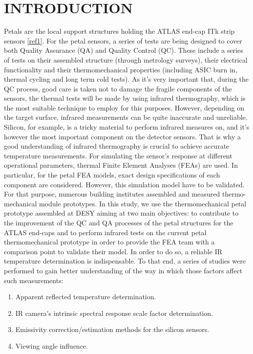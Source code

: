 \pagestyle{introduction}

\section*{\uppercase{Introduction}}\label{intro}
	\bigskip
	\bigskip
	Petals are the local support structures holding the ATLAS end-cap ITk strip sensors \ref{ref1}. For the petal sensors, a series of tests are being designed to cover both Quality Assurance (QA) and Quality Control (QC). These include a series of tests on their assembled structure (through metrology surveys), their electrical functionality and their thermomechanical properties (including ASIC burn in, thermal cycling and long term cold tests). 
	As it’s very important that, during the QC process, good care is taken not to damage the fragile components of the sensors, the thermal tests will be made by using infrared thermography, which is the most suitable technique to employ for this purposes. However, depending on the target surface, infrared measurements can be quite inaccurate and unreliable. Silicon, for example, is a tricky material to perform infrared measures on, and it’s however the most important component on the detector sensors. That is why a good understanding of infrared thermography is crucial to achieve accurate temperature measurements.
	For simulating the sensor's response at different operational parameters, thermal Finite Element Analyses (FEAs) are used. In particular, for the petal FEA models, exact design specifications of each component are considered. However, this simulation model have to be validated. For that purpose, numerous building institutes assembled and measured thermo-mechanical module prototypes. 
	In this study, we use the thermomechanical petal prototype assembled at DESY aiming at two main objectives: to contribute to the improvement of the QC and QA processes of the petal structures for the ATLAS end-caps and to perform infrared tests on the current petal thermomechanical prototype in order to provide the FEA team with a comparison point to validate their model. In order to do so, a reliable IR temperature determination is indispensable. To that end, a series of studies were performed to gain better understanding of the way in which those factors affect such measurements:
		
	\begin{enumerate}
		\item Apparent reflected temperature determination.
		\item IR camera’s intrinsic spectral response scale factor determination.
		\item Emissivity correction/estimation methods for the silicon sensors.
		\item Viewing angle influence.
	\end{enumerate}
	
